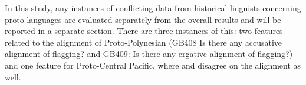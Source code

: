 \documentclass[a4paper,10pt]{article} %
\begin{document}
In this study, any instances of conflicting data from historical linguists concerning proto-languages are evaluated separately from the overall results and will be reported in a separate section. There are three instances of this: two features related to the alignment of Proto-Polynesian (GB408 Is there any accusative alignment of flagging? and GB409: Is there any ergative alignment of flagging?) and one feature for Proto-Central Pacific, where \citet{kikusawa2002proto} and \citet{ball2007ergativity} disagree on the alignment as well.



\end{document}

